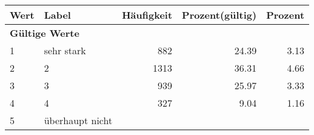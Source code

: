      \begin{longtable}{lXrrr}
     \toprule
     \textbf{Wert} & \textbf{Label} & \textbf{Häufigkeit} & \textbf{Prozent(gültig)} & \textbf{Prozent} \\
     \endhead
     \midrule
     \multicolumn{5}{l}{\textbf{Gültige Werte}}\\

     1 &
     \multicolumn{1}{X}{ sehr stark   } &


       \num{882} &
       \num[round-mode=places,round-precision=2]{24,39} &
         \num[round-mode=places,round-precision=2]{3,13} \\

     2 &
     \multicolumn{1}{X}{ 2   } &


       \num{1313} &
       \num[round-mode=places,round-precision=2]{36,31} &
         \num[round-mode=places,round-precision=2]{4,66} \\

     3 &
     \multicolumn{1}{X}{ 3   } &


       \num{939} &
       \num[round-mode=places,round-precision=2]{25,97} &
         \num[round-mode=places,round-precision=2]{3,33} \\

     4 &
     \multicolumn{1}{X}{ 4   } &


       \num{327} &
       \num[round-mode=places,round-precision=2]{9,04} &
         \num[round-mode=places,round-precision=2]{1,16} \\

     5 &
     \multicolumn{1}{X}{ überhaupt nicht   } &



\end{longtable}
